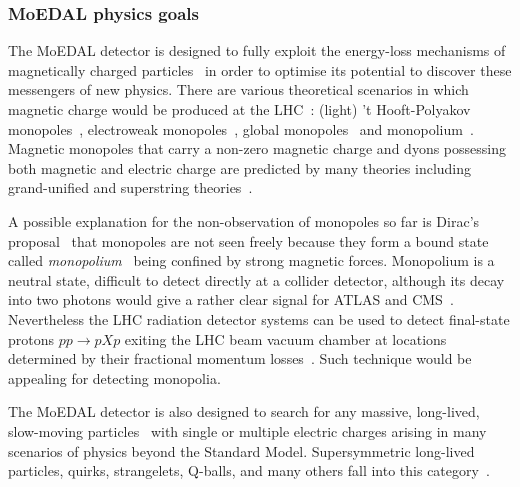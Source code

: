 \subsubsection{MoEDAL physics goals}\label{sc:mm}

The MoEDAL detector is designed to fully exploit the energy-loss mechanisms of magnetically charged particles~\cite{Dirac:1931kp,Dirac:1948um,tHooft:1974kcl,Polyakov:1974ek}  in order to optimise its potential to discover these messengers of new physics. There are various theoretical scenarios in which magnetic charge would be produced  at the LHC~\cite{Acharya:2014nyr}: (light) 't Hooft-Polyakov monopoles~\cite{tHooft:1974kcl,Polyakov:1974ek,Vento:2013jua}, electroweak monopoles~\cite{Cho:1996qd,Bae:2002bm,Cho:2012bq,Cho:2016npz,Ellis:2016glu}, global monopoles~\cite{Barriola:1989hx,Drukier:1981fq,Mazur:1990ak,Mavromatos:2016mnj} and monopolium~\cite{Dirac:1948um,Zeldovich:1978wj,Hill:1982iq,Dubrovich:2002gp}. Magnetic monopoles that carry a non-zero magnetic charge and dyons possessing both magnetic and electric charge are predicted by many theories including grand-unified and superstring theories~\cite{Rajantie:2012xh,Rajantie:2016paj,Kephart:2017esj}. 
 
A possible explanation for the non-observation of monopoles so far is Dirac's proposal~\cite{Dirac:1931kp,Dirac:1948um,Zeldovich:1978wj} that monopoles are not seen freely because they form a bound state called \emph{monopolium}~\cite{Hill:1982iq,Dubrovich:2002gp,Epele:2007ic,Epele:2008un} being confined by strong magnetic forces. Monopolium is a neutral state, difficult to detect directly at a collider detector, although its decay into two photons would give a rather clear signal for ATLAS and CMS~\cite{Epele:2016wps}. Nevertheless the LHC radiation detector systems can be used to detect final-state protons $pp\to pXp$ exiting the LHC beam vacuum chamber at locations determined by their fractional momentum losses~\cite{Kalliokoski:2016fjr}. Such technique would be appealing for detecting monopolia. 

The MoEDAL detector is also designed to search for any massive, long-lived, slow-moving particles~\cite{Fairbairn:2006gg,Burdin:2014xma} with single or multiple electric charges  arising in many scenarios of physics beyond the Standard Model. Supersymmetric long-lived particles, quirks, strangelets, Q-balls, and many others fall into this category~\cite{Acharya:2014nyr}.

